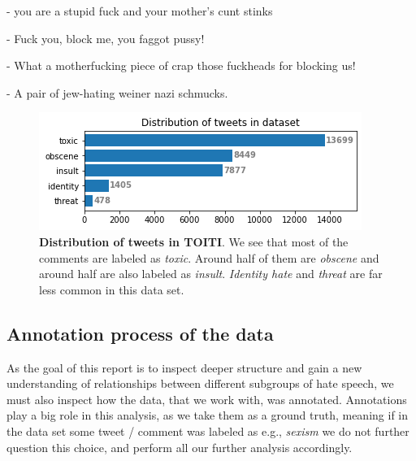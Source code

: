 \documentclass[fleqn,moreauthors,10pt]{ds_report}
\newcommand\bm{0.2pt}
\begin{document}
\begin{tcolorbox}[width=0.9\linewidth, center,arc=8pt,sharp corners=downhill, boxrule=0.3pt, left=\bm, top=\bm, right=\bm, bottom=\bm, fontupper=\small]
 - you are a stupid fuck and your mother's cunt stinks
\end{tcolorbox}

\begin{tcolorbox}[width=0.9\linewidth, center,arc=8pt,sharp corners=downhill, boxrule=0.3pt, left=\bm, top=\bm, right=\bm, bottom=\bm, fontupper=\small]
 - Fuck you, block me, you faggot pussy!
\end{tcolorbox}

\begin{tcolorbox}[width=0.9\linewidth, center,arc=8pt,sharp corners=downhill, boxrule=0.3pt, left=\bm, top=\bm, right=\bm, bottom=\bm, fontupper=\small]
 - What a motherfucking piece of crap those fuckheads for blocking us!
\end{tcolorbox}

\begin{tcolorbox}[width=0.9\linewidth, center,arc=8pt,sharp corners=downhill, boxrule=0.3pt, left=\bm, top=\bm, right=\bm, bottom=\bm, fontupper=\small]
 - A pair of jew-hating weiner nazi schmucks.
\end{tcolorbox}


\begin{figure}
	\includegraphics[width=\linewidth]{distribution_wiki_dataset.png}
	\caption{\textbf{Distribution of tweets in TOITI}. We see that most of the comments are labeled as \textit{toxic}. Around half of them are \textit{obscene} and around half are also labeled as \textit{insult}. \textit{Identity hate} and \textit{threat} are far less common in this data set.}
	\label{fig:distribution_wiki_dataset}
\end{figure}


\subsection{Annotation process of the data}
As the goal of this report is to inspect deeper structure and gain a new understanding of relationships between different subgroups of hate speech, we must also inspect how the data, that we work with, was annotated. Annotations play a big role in this analysis, as we take them as a ground truth, meaning if in the data set some tweet / comment was labeled as e.g., \textit{sexism} we do not further question this choice, and perform all our further analysis accordingly.
\end{document}
